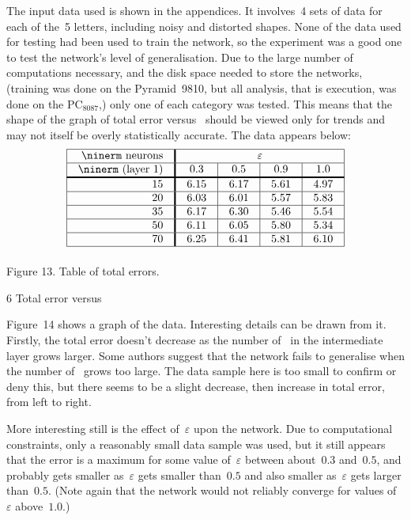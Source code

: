 The input data used is shown in the appendices.
It involves~4 sets of data for each of the~5 letters, including
noisy and distorted shapes.
None of the data used for testing had been used to train the network,
so the experiment was a good one to test the network's level of
generalisation.
Due to the large number of computations necessary, and the disk
space needed to store the networks, (training was done on the
Pyramid~9810, but all analysis, that is execution, was done on the
PC$_{8087}$,) only one of each category was tested.
This means that the shape of the graph of total error versus \neus\
should be viewed only for trends and may not itself be overly
statistically accurate.
The data appears below:
$$
\vbox{\tabskip=0pt \offinterlineskip
\def\tablerule{\noalign{\hrule}}
\halign{\strut#& \vrule#\tabskip=1em plus2em&
 \hfil#& \vrule width1.5pt#&
 \hfil#\hfil& \vrule#&
 \hfil#\hfil& \vrule#&
 \hfil#\hfil& \vrule#&
 \hfil#\hfil& \vrule#\tabskip=0pt\cr
\tablerule
&&{\ninerm neurons}&&\multispan{7}\hfil$\varepsilon$\hfil&\cr
\tablerule
&&{\ninerm (layer 1)}&&\hfil 0.3\hfil&&\hfil 0.5\hfil&&
 \hfil 0.9\hfil&&\hfil 1.0\hfil&\cr
\noalign{\hrule height1.5pt}
&&15&&6.15&&6.17&&5.61&&4.97&\cr
\tablerule
&&20&&6.03&&6.01&&5.57&&5.83&\cr
\tablerule
&&35&&6.17&&6.30&&5.46&&5.54&\cr
\tablerule
&&50&&6.11&&6.05&&5.80&&5.34&\cr
\tablerule
&&70&&6.25&&6.41&&5.81&&6.10&\cr
\tablerule
}}
$$
\centerline{Figure 13. Table of total errors.}

 {6} {Total error versus \neus}

Figure~14 shows a graph of the data.
Interesting details can be drawn from it.
Firstly, the total error doesn't decrease as the number of \neus\ in
the intermediate layer grows larger.
Some authors suggest that the network fails to generalise when the
number of \neus\ grows too large.
The data sample here is too small to confirm or deny this, but there
seems to be a slight decrease, then increase in total error,
from left to right.

More interesting still is the effect of~$\varepsilon$ upon the
network.
Due to computational constraints, only a reasonably small data
sample was used, but it still appears that the error is a maximum
for some value of~$\varepsilon$ between about~$0.3$ and~$0.5$, and probably
gets smaller as~$\varepsilon$ gets smaller than~$0.5$ and also
smaller as~$\varepsilon$ gets larger than~$0.5$. 
(Note again that the
network would not reliably converge for values of~$\varepsilon$
above~$1.0$.)

